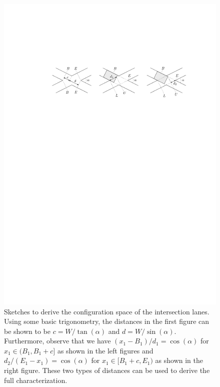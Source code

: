 \documentclass[a4paper]{report}
\theoremstyle{definition}
\theoremstyle{plain}
\newcommand\halfopen[2]{\ensuremath{[#1,#2)}}
\newcommand\openhalf[2]{\ensuremath{(#1,#2]}}
\begin{document}
\begin{figure}
  \centering
  \includegraphics[scale=1]{figures/configuration-space}
  \caption{Sketches to derive the configuration space of the intersection lanes.
    Using some basic trigonometry, the distances in the first figure can be
    shown to be $c = W / \tan(\alpha)$ and $d = W / \sin(\alpha)$. Furthermore,
    observe that we have $(x_{1} - B_{1}) / d_{1} = \cos(\alpha)$ for
    $x_{1} \in \openhalf{B_{1}}{B_{1} + c}$ as shown in the left figures and
    $d_{2}/(E_{1} - x_{1}) = \cos(\alpha)$ for
    $x_{1} \in \halfopen{B_{1} + c}{E_{1}}$ as shown in the right figure. These
    two types of distances can be used to derive the full characterization.}
  \label{fig:configuration-space}
\end{figure}
\end{document}
